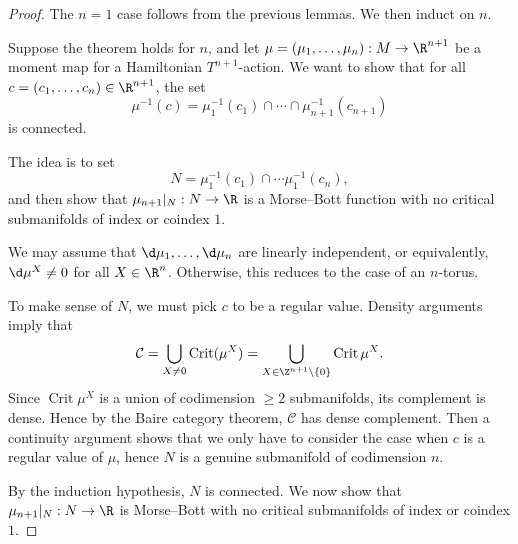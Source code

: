 \documentclass[a4paper]{article}
\DeclareMathOperator{\Crit}{Crit}
\begin{document}
\begin{proof}
  The $n = 1$ case follows from the previous lemmas. We then induct on $n$.

  Suppose the theorem holds for $n$, and let $\mu = (\mu_1, \ldots, \mu_n): M \to \R^{n + 1}$ be a moment map for a Hamiltonian $T^{n + 1}$-action. We want to show that for all $c = (c_1, \ldots, c_n) \in \R^{n + 1}$, the set
  \[
    \mu^{-1}(c) = \mu_1^{-1}(c_1) \cap \cdots \cap \mu_{n + 1}^{-1}(c_{n + 1})
  \]
  is connected.

  The idea is to set
  \[
    N = \mu_1^{-1}(c_1) \cap \cdots \mu_1^{-1}(c_n),
  \]
  and then show that $\mu_{n + 1}|_N: N \to \R$ is a Morse--Bott function with no critical submanifolds of index or coindex $1$.

  We may assume that $\d \mu_1, \ldots, \d \mu_n$ are linearly independent, or equivalently, $\d \mu^X \not= 0$ for all $X \in \R^n$. Otherwise, this reduces to the case of an $n$-torus.

  To make sense of $N$, we must pick $c$ to be a regular value. Density arguments imply that
  \[
    \mathcal{C} = \bigcup_{X \not= 0} \Crit(\mu^X) = \bigcup_{X \in \Z^{n + 1} \setminus \{0\}} \Crit \mu^X.
  \]
  Since $\Crit \mu^X$ is a union of codimension $\geq 2$ submanifolds, its complement is dense. Hence by the Baire category theorem, $\mathcal{C}$ has dense complement. Then a continuity argument shows that we only have to consider the case when $c$ is a regular value of $\mu$, hence $N$ is a genuine submanifold of codimension $n$.

  By the induction hypothesis, $N$ is connected. We now show that $\mu_{n + 1}|_N: N \to \R$ is Morse--Bott with no critical submanifolds of index or coindex $1$.
%


\end{proof}
\end{document}
